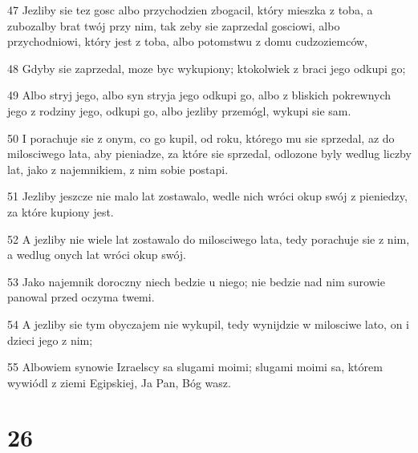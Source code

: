 \par 47 Jezliby sie tez gosc albo przychodzien zbogacil, który mieszka z toba, a zubozalby brat twój przy nim, tak zeby sie zaprzedal gosciowi, albo przychodniowi, który jest z toba, albo potomstwu z domu cudzoziemców,
\par 48 Gdyby sie zaprzedal, moze byc wykupiony; ktokolwiek z braci jego odkupi go;
\par 49 Albo stryj jego, albo syn stryja jego odkupi go, albo z bliskich pokrewnych jego z rodziny jego, odkupi go, albo jezliby przemógl, wykupi sie sam.
\par 50 I porachuje sie z onym, co go kupil, od roku, którego mu sie sprzedal, az do milosciwego lata, aby pieniadze, za które sie sprzedal, odlozone byly wedlug liczby lat, jako z najemnikiem, z nim sobie postapi.
\par 51 Jezliby jeszcze nie malo lat zostawalo, wedle nich wróci okup swój z pieniedzy, za które kupiony jest.
\par 52 A jezliby nie wiele lat zostawalo do milosciwego lata, tedy porachuje sie z nim, a wedlug onych lat wróci okup swój.
\par 53 Jako najemnik doroczny niech bedzie u niego; nie bedzie nad nim surowie panowal przed oczyma twemi.
\par 54 A jezliby sie tym obyczajem nie wykupil, tedy wynijdzie w milosciwe lato, on i dzieci jego z nim;
\par 55 Albowiem synowie Izraelscy sa slugami moimi; slugami moimi sa, którem wywiódl z ziemi Egipskiej, Ja Pan, Bóg wasz.

\chapter{26}

